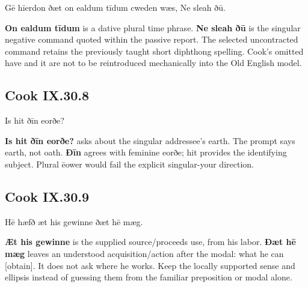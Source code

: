 \par\begin{minipage}{\linewidth}\raggedright
Gē hīerdon ðæt on ealdum tīdum cweden wæs, Ne sleah ðū.

\textbf{On ealdum tīdum} is a dative plural time phrase. \textbf{Ne sleah ðū} is the singular negative command quoted within the passive report. The selected uncontracted command retains the previously taught short diphthong spelling. Cook’s omitted have and it are not to be reintroduced mechanically into the Old English model.

\end{minipage}\par\addvspace{4pt}

\subsection*{Cook IX.30.8}

\par\begin{minipage}{\linewidth}\raggedright
Is hit ðīn eorðe?

\textbf{Is hit ðīn eorðe?} asks about the singular addressee’s earth. The prompt says earth, not oath. \textbf{Ðīn} agrees with feminine eorðe; hit provides the identifying subject. Plural ēower would fail the explicit singular-your direction.

\end{minipage}\par\addvspace{4pt}

\subsection*{Cook IX.30.9}

\par\begin{minipage}{\linewidth}\raggedright
Hē hæfð æt his gewinne ðæt hē mæg.

\textbf{Æt his gewinne} is the supplied source/\allowbreak{}proceeds use, from his labor. \textbf{Ðæt hē mæg} leaves an understood acquisition/\allowbreak{}action after the modal: what he can [obtain]. It does not ask where he works. Keep the locally supported sense and ellipsis instead of guessing them from the familiar preposition or modal alone.

\end{minipage}\par\addvspace{4pt}

